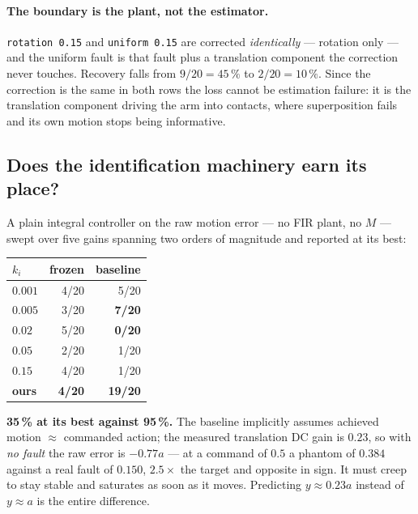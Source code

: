 \documentclass[11pt,a4paper]{article}
\newcommand{\code}[1]{\texttt{\small #1}}
\begin{document}
\paragraph{The boundary is the plant, not the estimator.}
\code{rotation 0.15} and \code{uniform 0.15} are corrected \emph{identically} --- rotation
only --- and the uniform fault is that fault plus a translation component the correction never
touches. Recovery falls from $9/20 = 45\,\%$ to $2/20 = 10\,\%$. Since the correction is the
same in both rows the loss cannot be estimation failure: it is the translation component
driving the arm into contacts, where superposition fails and its own motion stops being
informative.

\subsection{Does the identification machinery earn its place?}

A plain integral controller on the raw motion error --- no FIR plant, no $M$ --- swept over
five gains spanning two orders of magnitude and reported at its best:

\begin{center}
\begin{tabular}{lrr}
\toprule
$k_i$ & frozen & baseline \\
\midrule
$0.001$ & 4/20 & 5/20 \\
$\mathbf{0.005}$ & 3/20 & \textbf{7/20} \\
$0.02$ & 5/20 & \textbf{0/20} \\
$0.05$ & 2/20 & 1/20 \\
$0.15$ & 4/20 & 1/20 \\
\midrule
\textbf{ours} & \textbf{4/20} & \textbf{19/20} \\
\bottomrule
\end{tabular}
\end{center}

\textbf{35\,\% at its best against 95\,\%.} The baseline implicitly assumes achieved motion
$\approx$ commanded action; the measured translation DC gain is $0.23$, so with \emph{no
fault} the raw error is $-0.77a$ --- at a command of $0.5$ a phantom of $0.384$ against a real
fault of $0.150$, $2.5\times$ the target and opposite in sign. It must creep to stay stable
and saturates as soon as it moves. Predicting $y \approx 0.23a$ instead of $y \approx a$ is
the entire difference.

\end{document}
